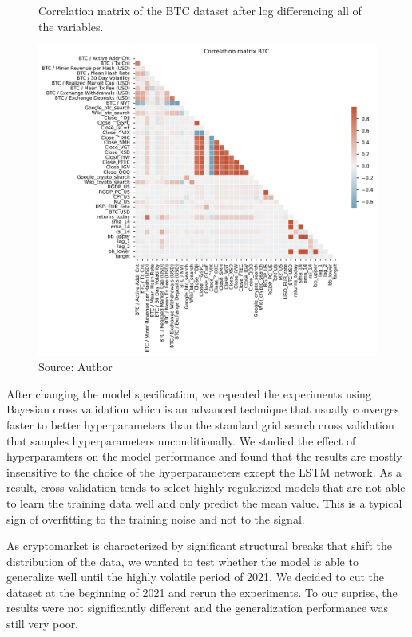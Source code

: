\begin{figure}[!h]
    \centering
    \caption{Correlation matrix of the BTC dataset after
    log differencing all of the variables.}
    \includegraphics[width=1\textwidth]{Figures/Corr_btc_logdiff.png}
    \caption*{Source: Author}
    \label{fig:Corr_btc_logdiff}
\end{figure}

After changing the model specification, we repeated the experiments
using Bayesian cross validation which is 
an advanced technique that 
usually converges faster to better hyperparameters than the standard
grid search cross validation that samples hyperparameters unconditionally. 
We studied the effect of hyperparamters on the model performance
and found that the results are mostly insensitive to the choice of the
hyperparameters except the \ac{LSTM} network. As a result, cross validation tends to 
select highly regularized models that 
are not able to learn the training data well and only predict the mean value.
This is a typical sign of overfitting to the training noise and
not to the signal. 


As cryptomarket is characterized by significant structural breaks
that shift the distribution of the data, we wanted
to test whether the model is able to generalize well
until the highly volatile period of 2021. We decided to cut 
the dataset at the beginning of 2021 and rerun the experiments.
To our suprise, the results were not significantly different and the 
generalization performance was still very poor.


